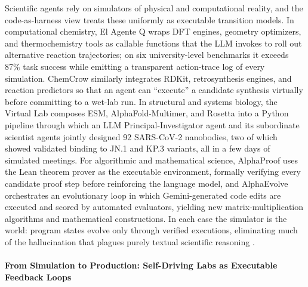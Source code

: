 \documentclass{llmxive}
\begin{document}
Scientific agents rely on simulators of physical and computational reality, and the code-as-harness view treats these uniformly as executable transition models. In computational chemistry, El Agente Q \citep{Zou_2025} wraps DFT engines, geometry optimizers, and thermochemistry tools as callable functions that the LLM invokes to roll out alternative reaction trajectories; on six university-level benchmarks it exceeds 87\% task success while emitting a transparent action-trace log of every simulation. ChemCrow \citep{bran2023chemcrowaugmentinglargelanguagemodels} similarly integrates RDKit, retrosynthesis engines, and reaction predictors so that an agent can ``execute'' a candidate synthesis virtually before committing to a wet-lab run. In structural and systems biology, the Virtual Lab \citep{swanson2025virtual} composes ESM, AlphaFold-Multimer, and Rosetta into a Python pipeline through which an LLM Principal-Investigator agent and its subordinate scientist agents jointly designed 92 SARS-CoV-2 nanobodies, two of which showed validated binding to JN.1 and KP.3 variants,  all in a few days of simulated meetings. For algorithmic and mathematical science, AlphaProof \citep{hubert2025olympiad} uses the Lean theorem prover as the executable environment, formally verifying every candidate proof step before reinforcing the language model, and AlphaEvolve \citep{novikov2025alphaevolvecodingagentscientific} orchestrates an evolutionary loop in which Gemini-generated code edits are executed and scored by automated evaluators, yielding new matrix-multiplication algorithms and mathematical constructions. In each case the simulator is the world: program states evolve only through verified executions, eliminating much of the hallucination that plagues purely textual scientific reasoning \citep{ren2026scientificintelligencesurveyllmbased}.

\paragraph{From Simulation to Production: Self-Driving Labs as Executable Feedback Loops}
\end{document}
